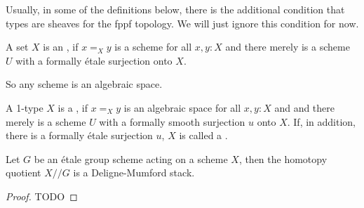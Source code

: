 Usually, in some of the definitions below,
there is the additional condition that types are sheaves for the fppf topology.
We will just ignore this condition for now.

\begin{definition}
  A set $X$ is an ,
  if $x=_Xy$ is a scheme for all $x,y:X$ and
  there merely is a scheme $U$ with a formally étale surjection onto $X$.
\end{definition}

So any scheme is an algebraic space.

\begin{definition}
  A 1-type $X$ is a ,
  if $x=_Xy$ is an algebraic space for all $x,y:X$ and
  and there merely is a scheme $U$ with a formally smooth surjection $u$ onto $X$.
  If, in addition, there is a formally étale surjection $u$,
  $X$ is called a .
\end{definition}

\begin{proposition}
  Let $G$ be an étale group scheme acting on a scheme $X$,
  then the homotopy quotient $X//G$ is a Deligne-Mumford stack.
\end{proposition}

\begin{proof}
  TODO
\end{proof}